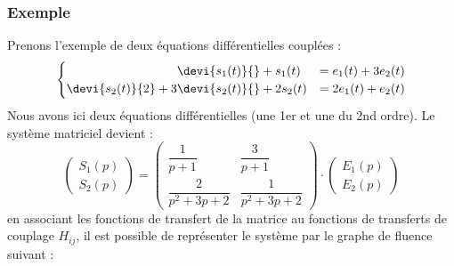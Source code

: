 \subsubsection*{Exemple}
Prenons l'exemple de deux équations différentielles couplées :
\[
\begin{cases}
\hphantom{\devi{s_2(t)}{2}+3}\devi{s_1(t)}{}+ s_1(t)  &=  e_1(t) + 3e_2(t) \\
          \devi{s_2(t)}{2}+3 \devi{s_2(t)}{}+ 2s_2(t) &= 2e_1(t) +  e_2(t)
\end{cases}
\]
Nous avons ici deux équations différentielles (une 1er et une du 2nd ordre).
Le système matriciel devient :
\[
    \begin{pmatrix} 
        S_1(p)\\
        S_2(p)
    \end{pmatrix}=
    \begin{pmatrix} 
    \dfrac{1}{p+1}      & \dfrac{3}{p+1} \\[2em] 
    \dfrac{2}{p^2+3p+2} & \dfrac{1}{p^2+3p+2} 
    \end{pmatrix}\cdot
    \begin{pmatrix} 
        E_1(p)\\
        E_2(p)
    \end{pmatrix}
\]
en associant les fonctions de transfert de la matrice au fonctions de transferts
de couplage $H_{ij}$, il est possible de représenter le système par le graphe 
de fluence suivant :
\begin{center}
    
\end{center}
\clearpage
